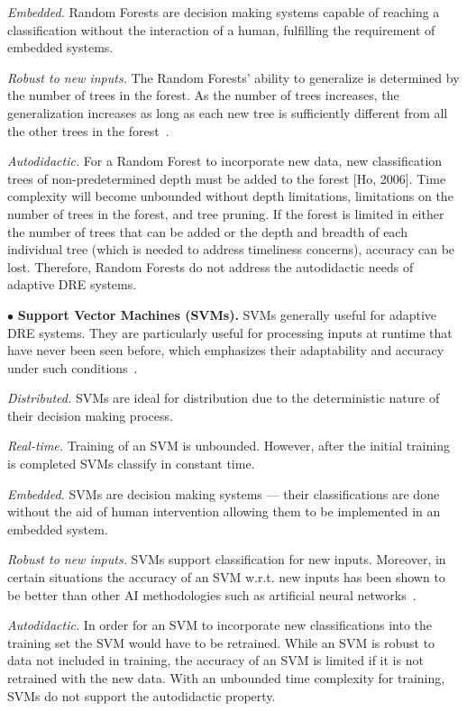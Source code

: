 \documentclass[conference]{IEEEtran}
\begin{document}
\emph{Embedded.} Random Forests are decision making systems capable of reaching a classification without the interaction of a human, fulfilling the requirement of embedded systems.

\emph{Robust to new inputs.} The Random Forests' ability to generalize is determined by the number of trees in the forest. As the number of trees increases, the generalization increases as long as each new tree is sufficiently different from all the other trees in the forest~\cite{Ho:95}.

\emph{Autodidactic.} For a Random Forest to incorporate new data, new classification trees of non-predetermined depth must be added to the forest [Ho, 2006]. Time complexity will become unbounded without depth limitations, limitations on the number of trees in the forest, and tree pruning. If the forest is limited in either the number of trees that can be added or the depth and breadth of each individual tree (which is needed to address timeliness concerns), accuracy can be lost. Therefore, Random Forests do not address the autodidactic needs of adaptive DRE systems. 

$\bullet$ {\bf Support Vector Machines (SVMs).} SVMs generally useful for adaptive DRE systems. They are particularly useful for processing inputs at runtime that have never been seen before, which emphasizes their adaptability and accuracy under such conditions~\cite{Hoffert:11}.

\emph{Distributed.} SVMs are ideal for distribution due to the deterministic nature of their decision making process.

\emph{Real-time.} Training of an SVM is unbounded. However, after the initial training is completed SVMs classify in constant time.

\emph{Embedded.} SVMs are decision making systems --- their classifications are done without the aid of human intervention allowing them to be implemented in an embedded system.

\emph{Robust to new inputs.} SVMs support classification for new inputs. Moreover, in certain situations the accuracy of an SVM w.r.t. new  inputs has been shown to be better than other AI methodologies such as artificial neural networks~\cite{Hoffert:11}.

\emph{Autodidactic.} In order for an SVM to incorporate new classifications into the training set the SVM would have to be retrained. While an SVM is robust to data not included in training, the accuracy of an SVM is limited if it is not retrained with the new data. With an unbounded time complexity for training, SVMs do not support the autodidactic property.
\end{document}
